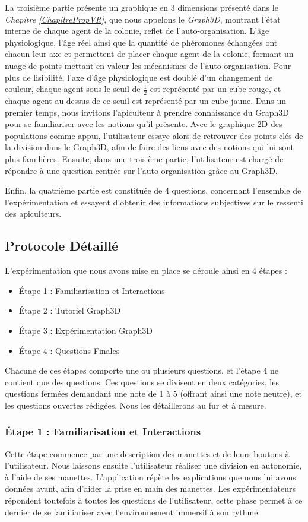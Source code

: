     La troisième partie présente un graphique en 3 dimensions présenté dans le \textit{Chapitre \ref{ChapitrePropVR}}, que nous appelons le \textit{Graph3D}, montrant l'état interne de chaque agent de la colonie, reflet de l'auto-organisation. L'âge physiologique, l'âge réel ainsi que la quantité de phéromones échangées ont chacun leur axe et permettent de placer chaque agent de la colonie, formant un nuage de points mettant en valeur les mécanismes de l'auto-organisation. Pour plus de lisibilité, l'axe d'âge physiologique est doublé d'un changement de couleur, chaque agent sous le seuil de $\frac{1}{2}$ est représenté par un cube rouge, et chaque agent au dessus de ce seuil est représenté par un cube jaune. Dans un premier temps, nous invitons l'apiculteur à prendre connaissance du Graph3D pour se familiariser avec les notions qu'il présente. Avec le graphique 2D des populations comme appui, l'utilisateur essaye alors de retrouver des points clés de la division dans le Graph3D, afin de faire des liens avec des notions qui lui sont plus familières. Ensuite, dans une troisième partie, l'utilisateur est chargé de répondre à une question centrée sur l'auto-organisation grâce au Graph3D.
    
    Enfin, la quatrième partie est constituée de 4 questions, concernant l'ensemble de l'expérimentation et essayent d'obtenir des informations subjectives sur le ressenti des apiculteurs.

		
		\subsection{Protocole Détaillé}
		
		L'expérimentation que nous avons mise en place se déroule ainsi en 4 étapes :
		\begin{itemize}
			\item Étape 1 : Familiarisation et Interactions
			\item Étape 2 : Tutoriel Graph3D
			\item Étape 3 : Expérimentation Graph3D
			\item Étape 4 : Questions Finales
		\end{itemize}
		Chacune de ces étapes comporte une ou plusieurs questions, et l'étape 4 ne contient que des questions. Ces questions se divisent en deux catégories, les questions fermées demandant une note de 1 à 5 (offrant ainsi une note neutre), et les questions ouvertes rédigées. Nous les détaillerons au fur et à mesure.
		
		\subsubsection{Étape 1 : Familiarisation et Interactions}
		Cette étape commence par une description des manettes et de leurs boutons à l'utilisateur. Nous laissons ensuite l'utilisateur réaliser une division en autonomie, à l'aide de ses manettes. L'application répète les explications que nous lui avons données avant, afin d'aider la prise en main des manettes. Les expérimentateurs répondent toutefois à toutes les questions de l'utilisateur, cette phase permet à ce dernier de se familiariser avec l'environnement immersif à son rythme.
		
